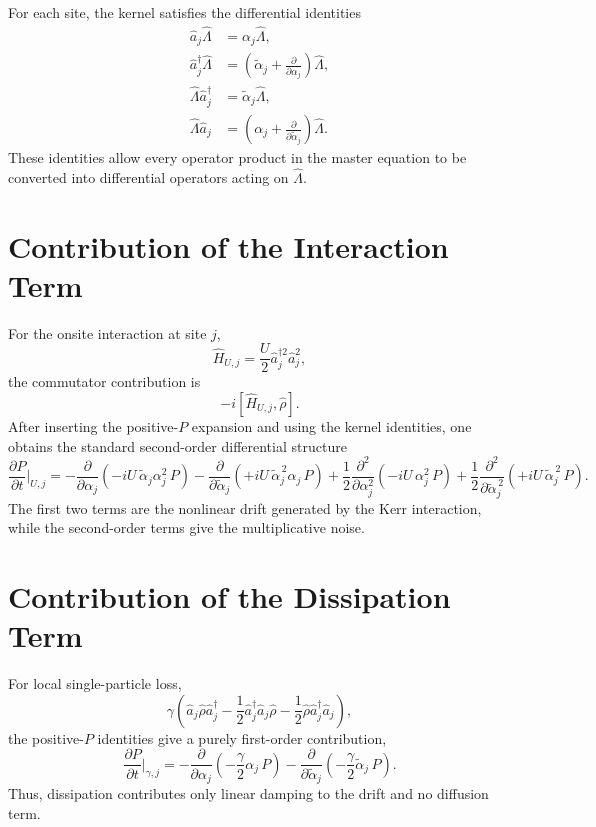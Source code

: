 \documentclass[12pt]{article}
\begin{document}
For each site, the kernel satisfies the differential identities
\begin{align}
\hat a_j \hat\Lambda &= \alpha_j \hat\Lambda, \\
\hat a_j^\dagger \hat\Lambda &= \left(\widetilde{\alpha}_j + \frac{\partial}{\partial \alpha_j}\right)\hat\Lambda, \\
\hat\Lambda \hat a_j^\dagger &= \widetilde{\alpha}_j \hat\Lambda, \\
\hat\Lambda \hat a_j &= \left(\alpha_j + \frac{\partial}{\partial \widetilde{\alpha}_j}\right)\hat\Lambda.
\end{align}
These identities allow every operator product in the master equation to be converted into differential operators acting on $\hat\Lambda$.

\section*{Contribution of the Interaction Term}
For the onsite interaction at site $j$,
\[
\hat H_{U,j} = \frac{U}{2}\hat a_j^{\dagger 2}\hat a_j^2,
\]
the commutator contribution is
\[
-i[\hat H_{U,j},\hat\rho].
\]
After inserting the positive-$P$ expansion and using the kernel identities, one obtains the standard second-order differential structure
\[
\frac{\partial P}{\partial t}\Big|_{U,j}
=
-\frac{\partial}{\partial \alpha_j}
\left(
-iU\,\widetilde{\alpha}_j\alpha_j^2\,P
\right)
-\frac{\partial}{\partial \widetilde{\alpha}_j}
\left(
+iU\,\widetilde{\alpha}_j^{\,2}\alpha_j\,P
\right)
+ \frac12 \frac{\partial^2}{\partial \alpha_j^2}
\left(
-iU\,\alpha_j^2\,P
\right)
+ \frac12 \frac{\partial^2}{\partial \widetilde{\alpha}_j^{\,2}}
\left(
+iU\,\widetilde{\alpha}_j^{\,2}\,P
\right).
\]
The first two terms are the nonlinear drift generated by the Kerr interaction, while the second-order terms give the multiplicative noise.

\section*{Contribution of the Dissipation Term}
For local single-particle loss,
\[
\gamma
\left(
\hat a_j \hat\rho \hat a_j^\dagger
- \frac12 \hat a_j^\dagger \hat a_j \hat\rho
- \frac12 \hat\rho \hat a_j^\dagger \hat a_j
\right),
\]
the positive-$P$ identities give a purely first-order contribution,
\[
\frac{\partial P}{\partial t}\Big|_{\gamma,j}
=
-\frac{\partial}{\partial \alpha_j}
\left(
-\frac{\gamma}{2}\alpha_j\,P
\right)
-\frac{\partial}{\partial \widetilde{\alpha}_j}
\left(
-\frac{\gamma}{2}\widetilde{\alpha}_j\,P
\right).
\]
Thus, dissipation contributes only linear damping to the drift and no diffusion term.
\end{document}
